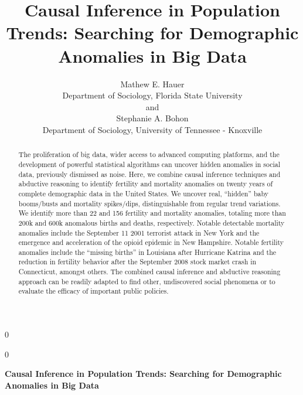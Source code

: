 \documentclass[12pt]{article}
\newcommand{\blind}{0}
\begin{document}
\def\spacingset#1{\renewcommand{\baselinestretch}%
{#1}\small\normalsize} \spacingset{1}



\blind
{
  \title{\bf Causal Inference in Population Trends: Searching for
Demographic Anomalies in Big Data}

  \author{
        Mathew E. Hauer \\
    Department of Sociology, Florida State University\\
     and \\     Stephanie A. Bohon \\
    Department of Sociology, University of Tennessee - Knoxville\\
      }
  \maketitle
} \fi

\blind
{
  \bigskip
  \bigskip
  \bigskip
  \begin{center}
    {\LARGE\bf Causal Inference in Population Trends: Searching for
Demographic Anomalies in Big Data}
  \end{center}
  \medskip
} \fi

\bigskip
\begin{abstract}
The proliferation of big data, wider access to advanced computing
platforms, and the development of powerful statistical algorithms can
uncover hidden anomalies in social data, previously dismissed as noise.
Here, we combine causal inference techniques and abductive reasoning to
identify fertility and mortality anomalies on twenty years of complete
demographic data in the United States. We uncover real, ``hidden'' baby
booms/busts and mortality spikes/dips, distinguishable from regular
trend variations. We identify more than 22 and 156 fertility and
mortality anomalies, totaling more than 200k and 600k anomalous births
and deaths, respectively. Notable detectable mortality anomalies include
the September 11 2001 terrorist attack in New York and the emergence and
acceleration of the opioid epidemic in New Hampshire. Notable fertility
anomalies include the ``missing births'' in Louisiana after Hurricane
Katrina and the reduction in fertility behavior after the September 2008
stock market crash in Connecticut, amongst others. The combined causal
inference and abductive reasoning approach can be readily adapted to
find other, undiscovered social phenomena or to evaluate the efficacy of
important public policies.
\end{abstract}
\end{document}
